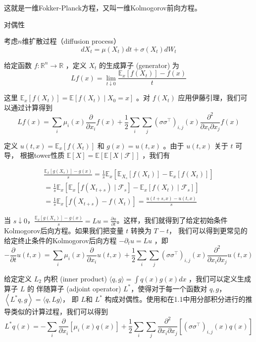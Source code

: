 这就是一维Fokker-Planck方程，又叫一维Kolmogorov前向方程。

对偶性

考虑$n$维扩散过程（diffusion process）
$$
d X_t=\mu\left(X_t\right) d t+\sigma\left(X_t\right) d W_t
$$

给定函数 $f: \mathbb{R}^n \rightarrow \mathbb{R}$ ，定义 $X_t$ 的生成算子 (generator) 为
$$
L f(x)=\lim _{t \downarrow 0} \frac{\mathbb{E}_x\left[f\left(X_t\right)\right]-f(x)}{t}
$$

这里 $\mathbb{E}_x\left[f\left(X_t\right)\right]=\mathbb{E}\left[f\left(X_t\right) \mid X_0=x\right]$ 。对 $f\left(X_t\right)$ 
应用伊藤引理，我们可以通过计算得到
$$
L f(x)=\sum_i \mu_i(x) \frac{\partial}{\partial x_i} f(x)+\frac{1}{2} \sum_i \sum_j\left(\sigma \sigma^{\top}\right)_{i, j}(x) \frac{\partial^2}{\partial x_i \partial x_j} f(x)
$$

定义 $u(t, x)=\mathbb{E}_x\left[f\left(X_t\right)\right]$ 和 $g(x)=u(t, x)$ 。由于 $u(t, x)$ 关于 $t$ 可导，
根据tower性质 $\mathbb{E}[X]=\mathbb{E}[\mathbb{E}[X \mid \mathcal{F}]]$ ，我们有

$$
\begin{gathered}
\frac{\mathbb{E}_x\left[g\left(X_s\right)\right]-g(x)}{s}=\frac{1}{s} \mathbb{E}_x\left[\mathbb{E}_{X_s}\left[f\left(X_t\right)\right]-\mathbb{E}_x\left[f\left(X_t\right)\right]\right] \\
=\frac{1}{s} \mathbb{E}_x\left[\mathbb{E}_x\left[f\left(X_{t+s}\right) \mid \mathcal{F}_s\right]-\mathbb{E}_x\left[f\left(X_t\right) \mid \mathcal{F}_s\right]\right] \\
=\frac{1}{s} \mathbb{E}_x\left[f\left(X_{t+s}\right)-f\left(X_t\right)\right]=\frac{u(t+s, x)-u(t, x)}{s}
\end{gathered}
$$

当 $s \downarrow 0$，$\frac{\mathbb{E}_x\left[g\left(X_s\right)\right]-g(x)}{s}=L u=\frac{\partial u}{\partial t}$。这样，我们就得到了给定初始条件Kolmogorov后向方程。如果我们把变量 $t$ 转换为 $T-t$，
我们可以得到更常见的给定终止条件的Kolmogorov后向方程 $-\partial_t u=L u$ ，即
$$
-\frac{\partial}{\partial t} u(t, x)=\sum_i \mu_i(x) \frac{\partial}{\partial x_i} u(t, x)+\frac{1}{2} \sum_i \sum_j\left(\sigma \sigma^{\top}\right)_{i, j}(x) \frac{\partial^2}{\partial x_i \partial x_j} u(t, x)
$$

给定定义 $L_2$ 内积 (inner product) $\langle q, g\rangle=\int q(x) g(x) d x$ ，我们可以定义生成算子 $L$ 的
伴随算子 (adjoint operator) $L^*$，使得对于每一个函数对 $q,g$，$\left\langle L^* q, g\right\rangle=\langle q, L g\rangle$，
即 $L$和 $L^*$ 构成对偶性。使用和在1.1中用分部积分进行的推导类似的计算过程，我们可以得到
$$
L^* q(x)=-\sum_i \frac{\partial}{\partial x_i}\left[\mu_i(x) q(x)\right]+\frac{1}{2} \sum_i \sum_j \frac{\partial^2}{\partial x_i \partial x_j}\left[\left(\sigma \sigma^{\top}\right)_{i, j}(x) q(x)\right]
$$

